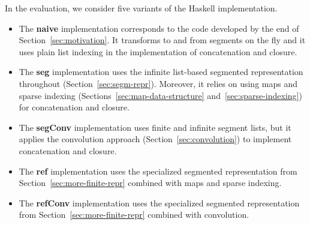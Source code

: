 In the evaluation, we consider five variants of the Haskell implementation.
\begin{itemize}
\item The \textbf{naive} implementation corresponds to the code developed by
  the end of Section~\ref{sec:motivation}. It transforms to and from
  segments on the fly and it uses plain list indexing in the
  implementation of concatenation and closure.
\item The \textbf{seg} implementation uses the infinite list-based segmented
  representation throughout (Section~\ref{sec:segm-repr}). Moreover,
  it relies on using maps and sparse indexing
  (Sections~\ref{sec:map-data-structure} and~\ref{sec:sparse-indexing})
  for concatenation and closure.
\item The \textbf{segConv} implementation uses finite and infinite
  segment lists, but it applies the convolution approach
  (Section~\ref{sec:convolution}) to implement concatenation and
  closure.
\item The \textbf{ref} implementation uses the specialized segmented
  representation from Section~\ref{sec:more-finite-repr} combined with
  maps and sparse indexing.
\item The \textbf{refConv} implementation uses the specialized
  segmented representation from Section~\ref{sec:more-finite-repr}
  combined with convolution.
\end{itemize}

